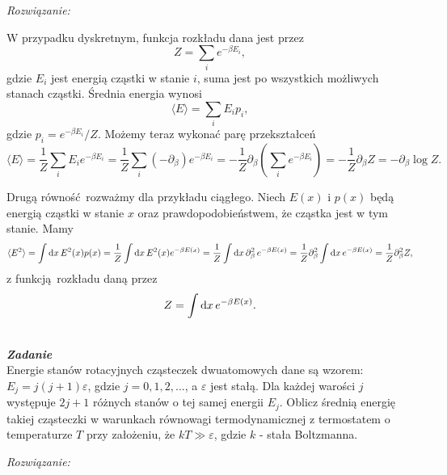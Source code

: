 \documentclass[11pt,a4paper]{article}
\newcounter{zadanie}\newcommand{\zadanie}[1][]{\addtocounter{zadanie}{1} ~\\  {\bf \emph{Zadanie \arabic{zadanie} #1 }} \\}
\begin{document}
{\em Rozwiązanie:}

W przypadku dyskretnym, funkcja rozkładu dana jest przez
\begin{equation}
	Z = \sum_i e^{-\beta E_i},
\end{equation}
gdzie $E_i$ jest energią cząstki w stanie $i$, suma jest po wszystkich możliwych stanach cząstki. Średnia energia wynosi
\begin{equation}
	\langle E \rangle = \sum_i E_i p_i,
\end{equation}
gdzie $p_i = e^{-\beta E_i}/Z$. Możemy teraz wykonać parę przekształceń
\begin{equation}
	\langle E \rangle = \frac{1}{Z}\sum_i E_i e^{-\beta E_i} = \frac{1}{Z} \sum_i (-\partial_{\beta}) e^{-\beta E_i} = -\frac{1}{Z} \partial_{\beta} \left(\sum_i e^{-\beta E_i}\right) = - \frac{1}{Z} \partial_{\beta} Z = - \partial_{\beta} \log Z.
\end{equation}

Drugą równość rozważmy dla przykładu ciągłego. Niech $E(x)$ i $p(x)$ będą energią cząstki w stanie $x$ oraz prawdopodobieństwem, że cząstka jest w tym stanie. Mamy
\begin{equation}
	\langle E^2 \rangle = \int {\rm d}x\, E^2(x) p(x) = \frac{1}{Z} \int {\rm d}x\, E^2(x) e^{-\beta E(x)} = \frac{1}{Z} \int {\rm d}x\, \partial_{\beta}^2\, e^{-\beta E(x)} = \frac{1}{Z}\partial_{\beta}^2  \int {\rm d}x\, e^{-\beta E(x)} = \frac{1}{Z}\partial_{\beta}^2 Z,
\end{equation}
z funkcją rozkładu daną przez
\begin{equation}
	Z = \int {\rm d}x\, e^{-\beta E(x)}.
\end{equation}

\newpage 
\zadanie
Energie stanów rotacyjnych cząsteczek dwuatomowych dane są wzorem: $E_j = j(j+1)\varepsilon$,
gdzie $j=0,1,2,...$, a $\varepsilon$ jest stałą. 
Dla każdej warości $j$  występuje $2j+1$ różnych stanów o tej samej energii $E_j$. 
Oblicz średnią energię takiej cząsteczki w warunkach równowagi termodynamicznej 
z termostatem o temperaturze $T$ przy założeniu, że $kT \gg \varepsilon$, gdzie $k$ - stała Boltzmanna.

{\em Rozwiązanie:} 
\end{document}
